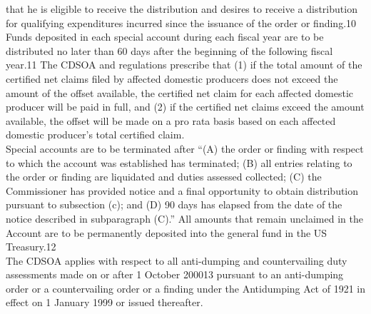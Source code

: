 \begin{tcolorbox}[breakable]
that he is eligible to receive the distribution and desires to receive a distribution for qualifying
expenditures incurred since the issuance of the order or finding.10 Funds deposited in each special
account during each fiscal year are to be distributed no later than 60 days after the beginning of the
following fiscal year.11 The CDSOA and regulations prescribe that (1) if the total amount of the
certified net claims filed by affected domestic producers does not exceed the amount of the offset
available, the certified net claim for each affected domestic producer will be paid in full, and (2) if the
certified net claims exceed the amount available, the offset will be made on a pro rata basis based on
each affected domestic producer’s total certified claim.\\

 \quad Special accounts are to be terminated after “(A) the order or finding with respect to which the
account was established has terminated; (B) all entries relating to the order or finding are liquidated
and duties assessed collected; (C) the Commissioner has provided notice and a final opportunity to
obtain distribution pursuant to subsection (c); and (D) 90 days has elapsed from the date of the notice
described in subparagraph (C).” All amounts that remain unclaimed in the Account are to be
permanently deposited into the general fund in the US Treasury.12\\

 \quad The CDSOA applies with respect to all anti-dumping and countervailing duty assessments
made on or after 1 October 200013 pursuant to an anti-dumping order or a countervailing order or a
finding under the Antidumping Act of 1921 in effect on 1 January 1999 or issued thereafter.

\end{tcolorbox}